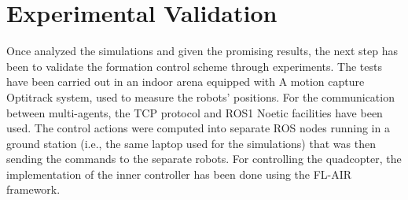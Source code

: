 \documentclass{ifacconf}
\begin{document}
\section{Experimental Validation}
\label{sec:experimental_validation}
Once analyzed the simulations and given the promising results, 
the next step has been to validate the formation control scheme 
through experiments.
The tests have been carried out in an indoor arena equipped with
A motion capture Optitrack system, used to measure the robots' positions.
For the communication between multi-agents, the TCP protocol and ROS1 Noetic
facilities have been used.
The control actions were computed into separate ROS nodes running in 
a ground station (i.e., the same laptop used for the simulations) that was then sending the commands to the separate robots.
For controlling the quadcopter, the implementation of the inner controller 
has been done using the FL-AIR framework.
\end{document}

